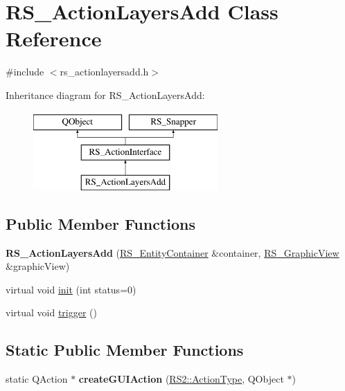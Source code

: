 \hypertarget{classRS__ActionLayersAdd}{\section{R\-S\-\_\-\-Action\-Layers\-Add Class Reference}
\label{classRS__ActionLayersAdd}
}


{\ttfamily \#include $<$rs\-\_\-actionlayersadd.\-h$>$}

Inheritance diagram for R\-S\-\_\-\-Action\-Layers\-Add\-:\begin{figure}[H]
\begin{center}
\leavevmode
\includegraphics[height=3.000000cm]{classRS__ActionLayersAdd}
\end{center}
\end{figure}
\subsection*{Public Member Functions}
\begin{DoxyCompactItemize}
\item 
\hypertarget{classRS__ActionLayersAdd_accb9910618d3e18ed984285169c6b904}{{\bfseries R\-S\-\_\-\-Action\-Layers\-Add} (\hyperlink{classRS__EntityContainer}{R\-S\-\_\-\-Entity\-Container} \&container, \hyperlink{classRS__GraphicView}{R\-S\-\_\-\-Graphic\-View} \&graphic\-View)}\label{classRS__ActionLayersAdd_accb9910618d3e18ed984285169c6b904}

\item 
virtual void \hyperlink{classRS__ActionLayersAdd_aa58e3b136512daf6a834366927a5d6d6}{init} (int status=0)
\item 
virtual void \hyperlink{classRS__ActionLayersAdd_aabe20da8e6901ebfa44c6f0dd45ceeb8}{trigger} ()
\end{DoxyCompactItemize}
\subsection*{Static Public Member Functions}
\begin{DoxyCompactItemize}
\item 
\hypertarget{classRS__ActionLayersAdd_a3e5e8ba596e1921557188457df73231f}{static Q\-Action $\ast$ {\bfseries create\-G\-U\-I\-Action} (\hyperlink{classRS2_afe3523e0bc41fd637b892321cfc4b9d7}{R\-S2\-::\-Action\-Type}, Q\-Object $\ast$)}\label{classRS__ActionLayersAdd_a3e5e8ba596e1921557188457df73231f}

\end{DoxyCompactItemize}
